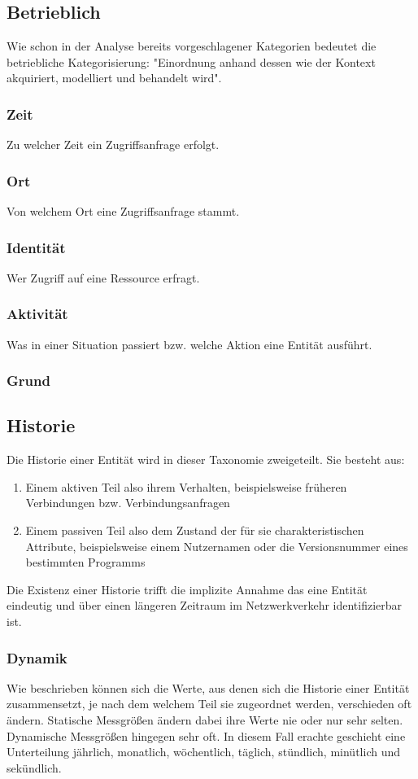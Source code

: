 \subsection{Betrieblich}
Wie schon in der Analyse bereits vorgeschlagener Kategorien bedeutet die betriebliche Kategorisierung: "Einordnung anhand dessen wie der Kontext akquiriert, modelliert und behandelt wird".
\subsubsection{Zeit}
Zu welcher Zeit ein Zugriffsanfrage erfolgt.
\subsubsection{Ort}
Von welchem Ort eine Zugriffsanfrage stammt.
\subsubsection{Identität}
Wer Zugriff auf eine Ressource erfragt.
\subsubsection{Aktivität}
Was in einer Situation passiert bzw. welche Aktion eine Entität ausführt.
\subsubsection{Grund}
\subsection{Historie}
Die Historie einer Entität wird in dieser Taxonomie zweigeteilt. Sie besteht aus:
\begin{enumerate}
\item{Einem aktiven Teil also ihrem Verhalten, beispielsweise früheren Verbindungen bzw. Verbindungsanfragen}
\item{Einem passiven Teil also dem Zustand der für sie charakteristischen Attribute, beispielsweise einem Nutzernamen oder die Versionsnummer eines bestimmten Programms}
\end{enumerate}
Die Existenz einer Historie trifft die implizite Annahme das eine Entität eindeutig und über einen längeren Zeitraum im Netzwerkverkehr identifizierbar ist.
\subsubsection{Dynamik}
Wie 
 beschrieben können sich die Werte, aus denen sich die Historie einer Entität zusammensetzt, je nach dem welchem Teil sie zugeordnet werden, verschieden oft ändern.
Statische Messgrößen ändern dabei ihre Werte nie oder nur sehr selten. Dynamische Messgrößen hingegen sehr oft. In diesem Fall erachte geschieht eine Unterteilung jährlich, monatlich, wöchentlich, täglich, stündlich, minütlich und sekündlich.
